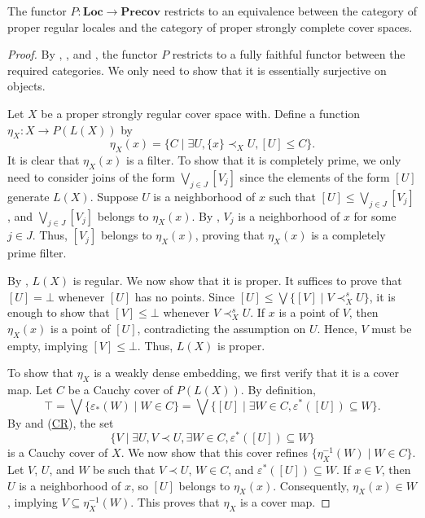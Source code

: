 \documentclass[reqno]{amsart}
\newcommand{\axref}[1]{(\hyperref[ax:#1]{#1})}
\theoremstyle{definition}
\theoremstyle{remark}
\numberwithin{figure}{section}
\newcommand{\rb}{\prec}
\newcommand{\cat}[1]{\mathbf{#1}}
\begin{document}
\begin{thm}
The functor $P : \cat{Loc} \to \cat{Precov}$ restricts to an equivalence between the category of proper regular locales and the category of proper strongly complete cover spaces.
\end{thm}
\begin{proof}
By , , and , the functor $P$ restricts to a fully faithful functor between the required categories.
We only need to show that it is essentially surjective on objects.

Let $X$ be a proper strongly regular cover space with.
Define a function $\eta_X : X \to P(L(X))$ by
\[ \eta_X(x) = \{ C \mid \exists U, \{ x \} \rb_X U, [U] \leq C \}. \]
It is clear that $\eta_X(x)$ is a filter.
To show that it is completely prime, we only need to consider joins of the form $\bigvee_{j \in J} [V_j]$ since the elements of the form $[U]$ generate $L(X)$.
Suppose $U$ is a neighborhood of $x$ such that $[U] \leq \bigvee_{j \in J} [V_j]$, and $\bigvee_{j \in J} [V_j]$ belongs to $\eta_X(x)$.
By , $V_j$ is a neighborhood of $x$ for some $j \in J$.
Thus, $[V_j]$ belongs to $\eta_X(x)$, proving that $\eta_X(x)$ is a completely prime filter.

By , $L(X)$ is regular.
We now show that it is proper.
It suffices to prove that $[U] = \bot$ whenever $[U]$ has no points.
Since $[U] \leq \bigvee \{ [V] \mid V \rb^s_X U \}$, it is enough to show that $[V] \leq \bot$ whenever $V \rb^s_X U$.
If $x$ is a point of $V$, then $\eta_X(x)$ is a point of $[U]$, contradicting the assumption on $U$.
Hence, $V$ must be empty, implying $[V] \leq \bot$.
Thus, $L(X)$ is proper.

To show that $\eta_X$ is a weakly dense embedding, we first verify that it is a cover map.
Let $C$ be a Cauchy cover of $P(L(X))$.
By definition, 
\[
\top = \bigvee \{ \varepsilon_*(W) \mid W \in C \} = \bigvee \{ [U] \mid \exists W \in C, \varepsilon^*([U]) \subseteq W \}.
\]
By  and \axref{CR}, the set 
\[
\{ V \mid \exists U, V \rb U, \exists W \in C, \varepsilon^*([U]) \subseteq W \}
\]
is a Cauchy cover of $X$.
We now show that this cover refines $\{ \eta_X^{-1}(W) \mid W \in C \}$.
Let $V$, $U$, and $W$ be such that $V \rb U$, $W \in C$, and $\varepsilon^*([U]) \subseteq W$.
If $x \in V$, then $U$ is a neighborhood of $x$, so $[U]$ belongs to $\eta_X(x)$.
Consequently, $\eta_X(x) \in W$, implying $V \subseteq \eta_X^{-1}(W)$.
This proves that $\eta_X$ is a cover map.


\end{proof}
\end{document}
